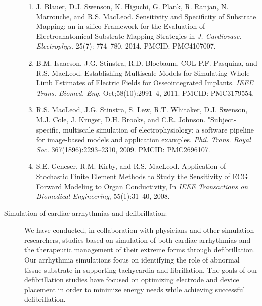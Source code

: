 \documentclass[10pt]{article}
\begin{document}
\begin{description}
    \begin{enumerate}
      \item J. Blauer, D.J. Swenson, K. Higuchi, G. Plank, R. Ranjan,
        N. Marrouche, and R.S. MacLeod. Sensitivity and Specificity of
        Substrate Mapping: an in silico Framework for the Evaluation of
        Electroanatomical Substrate Mapping Strategies in
        \emph{J. Cardiovasc. Electrophys.} 25(7): 774--780, 2014.  PMCID:
        PMC4107007. 
      \item B.M. Isaacson, J.G. Stinstra, R.D. Bloebaum, COL P.F. Pasquina,
        and R.S. MacLeod. Establishing Multiscale Models for Simulating
        Whole Limb Estimates of Electric Fields for Osseointegrated
        Implants.  \emph{IEEE Trans. Biomed. Eng.} Oct;58(10):2991--4,
        2011.  PMCID: PMC3179554. 
      \item R.S. MacLeod, J.G. Stinstra, S. Lew, R.T.  Whitaker,
        D.J. Swenson, M.J. Cole, J. Kruger, D.H. Brooks, and
        C.R. Johnson. "Subject-specific, multiscale simulation of
        electrophysiology: a software pipeline for image-based models and
        application examples.  \emph{Phil. Trans.  Royal Soc.}
        367(1896):2293--2310, 2009. PMCID: PMC2696107.
      \item S.E. Geneser, R.M. Kirby, and R.S. MacLeod. Application of
        Stochastic Finite Element Methods to Study the Sensitivity of ECG
        Forward Modeling to Organ Conductivity, In \emph{IEEE Transactions
          on Biomedical Engineering}, 55(1):31--40, 2008.  
    \end{enumerate}

  \item [Simulation of cardiac arrhythmias and defibrillation: ] We have
    conducted, in collaboration with physicians and other simulation
    researchers, studies based on simulation of both cardiac arrhythmias
    and the therapeutic management of their extreme forms through
    defibrillation. Our arrhythmia simulations focus on identifying the
    role of abnormal tissue substrate in supporting tachycardia and
    fibrillation. The goals of our defibrillation studies have focused on
    optimizing electrode and device placement in order to minimize energy
    needs while achieving successful defibrillation. 


\end{description}
\end{document}
